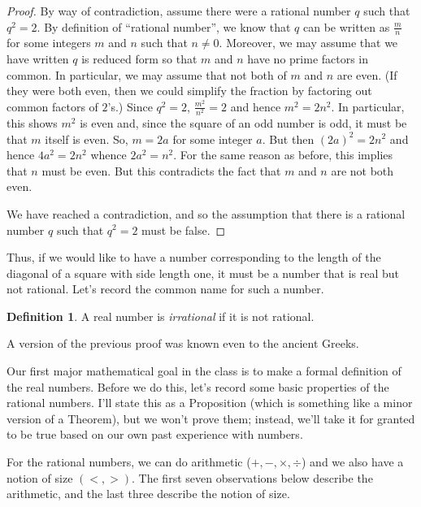 \documentclass[12pt]{amsart}
\numberwithin{equation}{section}
\theoremstyle{plain} %
\theoremstyle{definition}
\newtheorem{defn}[equation]{Definition}
\theoremstyle{remark}
\begin{document}
\begin{proof} By way of contradiction, assume there were a rational number $q$ such that $q^2 = 2$. By definition of ``rational number'',  
we know that $q$ can be written as  $\frac{m}{n}$ for
some integers $m$ and $n$ such that $n \ne 0$. Moreover, we may assume that we have written $q$ is reduced form so that $m$ and $n$ have no
prime factors in common. In particular, we may assume that not both of $m$ and $n$ are even. (If they
  were both even, then  we could simplify the fraction by factoring out common factors of $2$'s.) Since $q^2 = 2$,
  $\frac{m^2}{n^2} = 2$ and hence $m^2 = 2n^2$. In particular, this shows $m^2$ is even and, since the square of an odd number is odd, it must be that $m$
  itself is even. So, $m = 2 a$ for some integer $a$. But then $(2a)^2 = 2n^2$ and hence $4a^2 = 2n^2$ whence $2a^2 = n^2$. For the same reason as before, this
  implies that $n$
  must be even. But this contradicts the fact that $m$ and $n$ are not both even. 

We have reached a contradiction, and so the assumption that there is a rational number $q$ such that $q^2 = 2$ must be false.
\end{proof}

Thus, if we would like to have a number corresponding to the length of the diagonal of a square with side length one, it must be a number that is real but not rational. Let's record the common name for such a number.

\begin{defn} A real number is \emph{irrational} if it is not rational.
\end{defn}


A version of the previous proof was known even to the ancient Greeks.


Our first major mathematical goal in the class is to make a formal definition of the real numbers. 
Before we do this, let's record some basic properties of the rational numbers. I'll state this as a Proposition (which is something like a minor version of a Theorem), but we won't prove them; instead, we'll take it for granted to be true based on our own past experience with numbers.

For the rational numbers, we can do arithmetic ($+,-,\times,\div$) and we also have a notion of size $(<,>)$. The first seven observations below describe the arithmetic, and the last three describe the notion of size.
\end{document}
